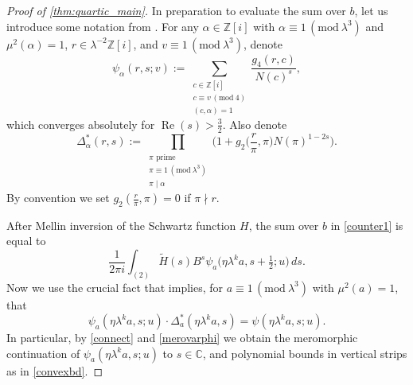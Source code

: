 \documentclass[12pt,reqno]{amsart}
\numberwithin{equation}{section}
\renewcommand{\Re}{\operatorname{Re}}
\renewcommand{\pmod}[1]{\, (\mathrm{mod}\ #1)}
\newcommand{\Z}{\mathbb{Z}}
\newcommand{\C}{\mathbb{C}}
\begin{document}
\begin{proof}[Proof of \cref{thm:quartic_main}]
In preparation to evaluate the sum over $b$, let us introduce some notation from \cite[Section 6]{CDD26}. For any $\alpha \in \Z[i]$ with $\alpha\equiv 1 \pmod{\lambda^3}$ and $\mu^2(\alpha)=1$, $r \in \lambda^{-2} \mathbb{Z}[i]$, and $v \equiv 1 \pmod{\lambda^3}$, denote
    \begin{equation*}
        \psi_\alpha(r,s; v) := \sum_{\substack{c \in \Z[i] \\ c \equiv v \pmod{4} \\ (c, \alpha)=1}}  \frac{g_4(r, c)}{N(c)^s},
    \end{equation*}
    which converges absolutely for $\Re(s)>\frac{3}{2}$. Also denote
    \begin{equation} \label{deltastardef}
        \Delta_{\alpha}^{*}(r, s) := \prod_{\substack{\pi \text{ prime} \\ \pi \equiv 1 \pmod{\lambda^3} \\ \pi \mid \alpha}}  \Big(1+ g_2\Big(\frac{r}{\pi},\pi\Big) N(\pi)^{1-2s} \Big).
    \end{equation}
    By convention we set $g_2(\frac{r}{\pi}, \pi) = 0$ if $\pi \nmid r$.

    After Mellin inversion of the Schwartz function $H$, the sum over $b$ in \eqref{counter1} is equal to
    \begin{equation} \label{counter2}
        \frac{1}{2 \pi i} \int_{(2)} \widetilde{H}(s) B^s \psi_a\big(\eta \lambda^k a, s + \tfrac{1}{2}; u\big) \, ds.
    \end{equation}
    Now we use the crucial fact that \cite[Lemma 6.1 (iii)]{CDD26} implies, for $a \equiv 1 \pmod{\lambda^3}$ with $\mu^2(a)=1$, that
    \begin{equation*}
        \psi_{a}(\eta \lambda^k a, s; u) \cdot \Delta^{*}_{a}(\eta \lambda^k a, s) = \psi(\eta \lambda^k a, s; u).
    \end{equation*}
    In particular, by \eqref{connect} and \cref{merovarphi} we obtain the meromorphic continuation of $\psi_{a}(\eta \lambda^k a, s; u)$ to $s \in \C$, and polynomial bounds in vertical strips as in \eqref{convexbd}.
    

\end{proof}
\end{document}
